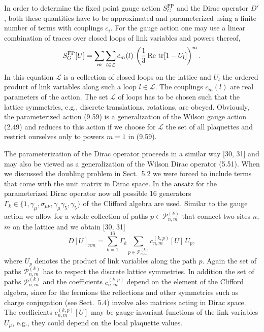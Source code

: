 In order to determine the fixed point gauge action $S^{\mathrm{FP}}_G$ and the
Dirac operator $D'$, both these quantities have to be approximated and
parameterized using a finite number of terms with couplings $c_i$. For the
gauge action one may use a linear combination of traces over closed loops of
link variables and powers thereof,
\begin{equation}
  S^{\mathrm{FP}}_G[U] = \sum_m\sum_{l\in\mathcal{L}}c_m(l)\,
    \left(\frac{1}{3}\,\mathrm{Re}\,\operatorname{tr}[1-U_l]\right)^m .
\end{equation}
In this equation $\mathcal{L}$ is a collection of closed loops on the lattice
and $U_l$ the ordered product of link variables along such a loop $l \in
\mathcal{L}$. The couplings $c_m(l)$ are real parameters of the action. The set
$\mathcal{L}$ of loops has to be chosen such that the lattice symmetries,
e.g., discrete translations, rotations, are obeyed. Obviously, the
parameterized action (9.59) is a generalization of the Wilson gauge action
(2.49) and reduces to this action if we choose for $\mathcal{L}$ the set of all
plaquettes and restrict ourselves only to powers $m = 1$ in (9.59).

The parameterization of the Dirac operator proceeds in a similar way [30, 31]
and may also be viewed as a generalization of the Wilson Dirac operator (5.51).
When we discussed the doubling problem in Sect.~5.2 we were forced to include
terms that come with the unit matrix in Dirac space. In the ansatz for the
parameterized Dirac operator now all possible 16 generators $\Gamma_k \in \{1,
\gamma_\mu, \sigma_{\mu\nu}, \gamma_\mu\gamma_5, \gamma_5\}$ of the Clifford
algebra are used. Similar to the gauge action we allow for a whole collection
of paths $p \in \mathcal{P}^{(k)}_{n,m}$ that connect two sites $n$, $m$ on the
lattice and we obtain [30, 31]
\begin{equation}
  D[U]_{nm} = \sum_{k=1}^{16}\Gamma_k
    \sum_{p\in\mathcal{P}^{(k)}_{n,m}}c^{(k,p)}_{n,m}[U]\,U_p ,
\end{equation}
where $U_p$ denotes the product of link variables along the path $p$. Again
the set of paths $\mathcal{P}^{(k)}_{n,m}$ has to respect the discrete lattice
symmetries. In addition the set of paths $\mathcal{P}^{(k)}_{n,m}$ and the
coefficients $c^{(k,p)}_{n,m}$ depend on the element of the Clifford algebra,
since for the fermions the reflections and other symmetries such as charge
conjugation (see Sect.~5.4) involve also matrices acting in Dirac space. The
coefficients $c^{(k,p)}_{n,m}[U]$ may be gauge-invariant functions of the link
variables $U_\mu$, e.g., they could depend on the local plaquette values.

